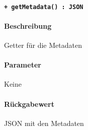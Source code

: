\paragraph{\texttt{+ getMetadata() : JSON}}%
\paragraph*{Beschreibung}
Getter für die Metadaten
\paragraph*{Parameter}
Keine
\paragraph*{Rückgabewert}
JSON mit den Metadaten